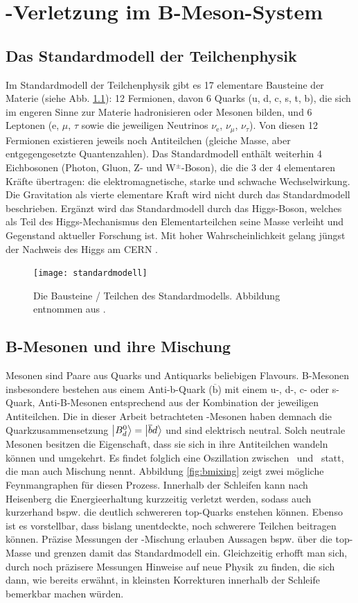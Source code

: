 \chapter[\CP-Verletzung im B-Meson-System]{\CP-Verletzung im B-Meson-System} \label{kap:cp-verletzung}
\section{Das Standardmodell der Teilchenphysik}
Im Standardmodell der Teilchenphysik gibt es 17 elementare Bausteine der Materie (siehe Abb. \ref{fig:standardmodell}): 12 Fermionen, davon 6 Quarks (u, d, c, s, t, b), die sich im engeren Sinne zur Materie hadronisieren oder Mesonen bilden, und 6 Leptonen (e, $\mu$, $\tau$ sowie die jeweiligen Neutrinos $\nu_{\text{e}}$, $\nu_{\mu}$, $\nu_{\tau}$). Von diesen 12 Fermionen existieren jeweils noch Antiteilchen (gleiche Masse, aber entgegengesetzte Quantenzahlen). Das Standardmodell enthält weiterhin 4 Eichbosonen (Photon, Gluon, Z- und W$^{\pm}$-Boson), die die 3 der 4 elementaren Kräfte übertragen: die elektromagnetische, starke und schwache Wechselwirkung. Die Gravitation als vierte elementare Kraft wird nicht durch das Standardmodell beschrieben. Ergänzt wird das Standardmodell durch das Higgs-Boson, welches als Teil des Higgs-Mechanismus den Elementarteilchen seine Masse verleiht und Gegenstand aktueller Forschung ist. Mit hoher Wahrscheinlichkeit gelang jüngst der Nachweis des Higgs am CERN \cite{higgs}.
\begin{figure}[hptb]
\centering
\texttt{[image: standardmodell]}
\caption{Die Bausteine / Teilchen des Standardmodells. Abbildung entnommen aus \cite{wiki_standard}.}
\label{fig:standardmodell}
\end{figure}

\section{B-Mesonen und ihre Mischung}
Mesonen sind Paare aus Quarks und Antiquarks beliebigen Flavours. B-Mesonen insbesondere bestehen aus einem Anti-b-Quark ($\mathrm{\overline{b}}$) mit einem u-, d-, c- oder s-Quark, Anti-B-Mesonen entsprechend aus der Kombination der jeweiligen Antiteilchen. Die in dieser Arbeit betrachteten \Bd-Mesonen haben demnach die Quarkzusammensetzung $\Ket{\text{$B_d^0$}} = \Ket{\overline{b}d}$ und sind elektrisch neutral. Solch neutrale Mesonen besitzen die Eigenschaft, dass sie sich in ihre Antiteilchen wandeln können und umgekehrt. Es findet folglich eine Oszillation zwischen \Bd\ und \Bdbar\ statt, die man auch Mischung nennt. Abbildung \ref{fig:bmixing} zeigt zwei mögliche Feynmangraphen für diesen Prozess. Innerhalb der Schleifen kann nach Heisenberg die Energieerhaltung kurzzeitig verletzt werden, sodass auch kurzerhand bspw. die deutlich schwereren top-Quarks enstehen können. Ebenso ist es vorstellbar, dass bislang unentdeckte, noch schwerere Teilchen beitragen können. Präzise Messungen der \Bd-Mischung erlauben Aussagen bspw. über die top-Masse und grenzen damit das Standardmodell ein. Gleichzeitig erhofft man sich, durch noch präzisere Messungen Hinweise auf \glqq neue Physik\grqq\ zu finden, die sich dann, wie bereits erwähnt, in kleinsten Korrekturen innerhalb der Schleife bemerkbar machen würden.

